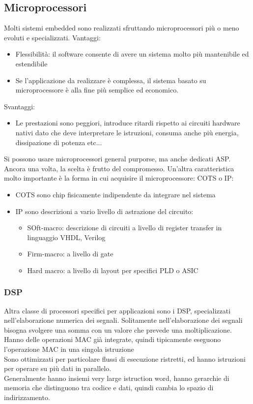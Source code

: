 \documentclass{article}
\begin{document}
\subsection{Microprocessori}
Molti sistemi embedded sono realizzati sfruttando microprocessori più o meno evoluti e specializzati. Vantaggi:
\begin{itemize}
\item Flessibilità: il software consente di avere un sistema molto più mantenibile ed estendibile
\item Se l'applicazione da realizzare è complessa, il sistema basato su microprocessore è alla fine più semplice ed economico.
\end{itemize}
Svantaggi:
\begin{itemize}
\item Le prestazioni sono peggiori, introduce ritardi rispetto ai circuiti hardware nativi dato che deve interpretare le istruzioni, consuma anche più energia, dissipazione di potenza etc...
\end{itemize}
Si possono usare microprocessori general purporse, ma anche dedicati ASP. Ancora una volta, la scelta è frutto del compromesso. Un'altra caratteristica molto importante è la forma in cui acquisire il microprocessore: COTS o IP:
\begin{itemize}
\item COTS sono chip fisicamente indipendente da integrare nel sistema
\item IP sono descrizioni a vario livello di astrazione del circuito:
\begin{itemize}
\item SOft-macro: descrizione di circuiti a livello di register transfer in linguaggio VHDL, Verilog
\item Firm-macro: a livello di gate 
\item Hard macro: a livello di layout per specifici PLD o ASIC
\end{itemize}
\end{itemize}
\subsubsection{DSP}
Altra classe di processori specifici per applicazioni sono i DSP, specializzati nell'elaborazione numerica dei segnali. Solitamente nell'elaborazione dei segnali bisogna svolgere una somma con un valore che prevede una moltiplicazione. Hanno delle operazioni MAC già integrate, quindi tipicamente eseguono l'operazione MAC in una singola istruzione\\ Sono ottimizzati per particolare flussi di esecuzione ristretti, ed hanno istruzioni per operare su più dati in parallelo.\\ Generalmente hanno insiemi very large istruction word, hanno gerarchie di memoria che distinguono tra codice e dati, quindi cambia lo spazio di indirizzamento.
\end{document}
